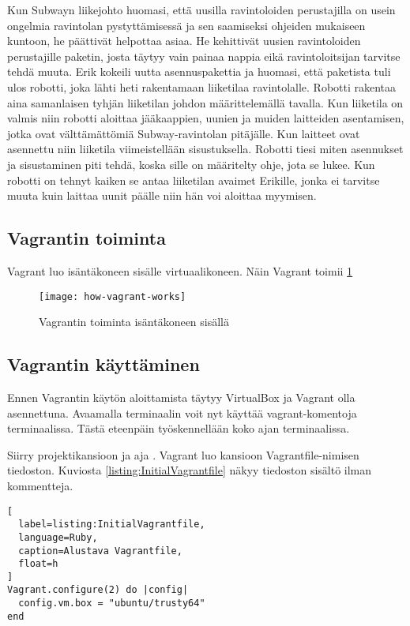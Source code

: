 Kun Subwayn liikejohto huomasi, että uusilla ravintoloiden perustajilla on usein ongelmia ravintolan pystyttämisessä ja sen saamiseksi ohjeiden mukaiseen kuntoon,  he päättivät helpottaa asiaa. He kehittivät uusien ravintoloiden perustajille paketin, josta täytyy vain painaa nappia eikä ravintoloitsijan tarvitse tehdä muuta. Erik kokeili uutta asennuspakettia ja huomasi, että paketista tuli ulos robotti, joka lähti heti rakentamaan liiketilaa ravintolalle. Robotti rakentaa aina samanlaisen tyhjän liiketilan johdon määrittelemällä tavalla. Kun liiketila on valmis niin robotti aloittaa jääkaappien, uunien ja muiden laitteiden asentamisen, jotka ovat välttämättömiä Subway-ravintolan pitäjälle. Kun laitteet ovat asennettu niin liiketila viimeistellään sisustuksella. Robotti tiesi miten asennukset ja sisustaminen piti tehdä, koska sille on määritelty ohje, jota se lukee. Kun robotti on tehnyt kaiken se antaa liiketilan avaimet Erikille, jonka ei tarvitse muuta kuin laittaa uunit päälle niin hän voi aloittaa myymisen.

\subsection{Vagrantin toiminta}
Vagrant luo isäntäkoneen sisälle virtuaalikoneen. 
Näin Vagrant toimii \ref{fig:how-vagrant-works}

\begin{figure}[h]
  \texttt{[image: how-vagrant-works]}
  \caption{Vagrantin toiminta isäntäkoneen sisällä}
  \label{fig:how-vagrant-works}
\end{figure}

\subsection{Vagrantin käyttäminen}
Ennen Vagrantin käytön aloittamista täytyy VirtualBox ja Vagrant olla asennettuna. Avaamalla terminaalin voit nyt käyttää vagrant-komentoja terminaalissa. Tästä eteenpäin työskennellään koko ajan terminaalissa.

Siirry projektikansioon ja aja . Vagrant luo kansioon Vagrantfile-nimisen tiedoston. Kuviosta \ref{listing:InitialVagrantfile} näkyy tiedoston sisältö ilman kommentteja.

\begin{lstlisting}[
  label=listing:InitialVagrantfile,
  language=Ruby,
  caption=Alustava Vagrantfile,
  float=h
]
Vagrant.configure(2) do |config|
  config.vm.box = "ubuntu/trusty64"
end
\end{lstlisting}

